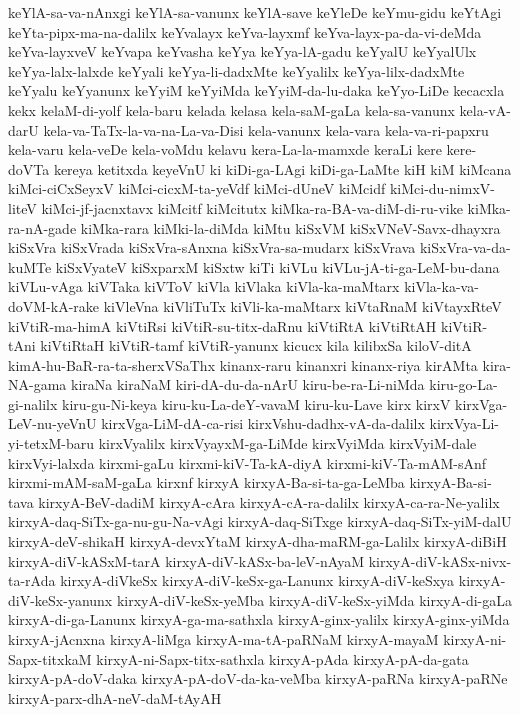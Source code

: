 {keYlA-sa-va-nAnxgi
keYlA-sa-vanunx
keYlA-save
keYleDe
keYmu-gidu
keYtAgi
keYta-pipx-ma-na-dalilx
keYvalayx
keYva-layxmf
keYva-layx-pa-da-vi-deMda
keYva-layxveV
keYvapa
keYvasha
keYya
keYya-lA-gadu
keYyalU
keYyalUlx
keYya-lalx-lalxde
keYyali
keYya-li-dadxMte
keYyalilx
keYya-lilx-dadxMte
keYyalu
keYyanunx
keYyiM
keYyiMda
keYyiM-da-lu-daka
keYyo-LiDe
kecacxla
kekx
kelaM-di-yolf
kela-baru
kelada
kelasa
kela-saM-gaLa
kela-sa-vanunx
kela-vA-darU
kela-va-TaTx-la-va-na-La-va-Disi
kela-vanunx
kela-vara
kela-va-ri-papxru
kela-varu
kela-veDe
kela-voMdu
kelavu
kera-La-la-mamxde
keraLi
kere
kere-doVTa
kereya
ketitxda
keyeVnU
ki
kiDi-ga-LAgi
kiDi-ga-LaMte
kiH
kiM
kiMcana
kiMci-ciCxSeyxV
kiMci-cicxM-ta-yeVdf
kiMci-dUneV
kiMcidf
kiMci-du-nimxV-liteV
kiMci-jf-jacnxtavx
kiMcitf
kiMcitutx
kiMka-ra-BA-va-diM-di-ru-vike
kiMka-ra-nA-gade
kiMka-rara
kiMki-la-diMda
kiMtu
kiSxVM
kiSxVNeV-Savx-dhayxra
kiSxVra
kiSxVrada
kiSxVra-sAnxna
kiSxVra-sa-mudarx
kiSxVrava
kiSxVra-va-da-kuMTe
kiSxVyateV
kiSxparxM
kiSxtw
kiTi
kiVLu
kiVLu-jA-ti-ga-LeM-bu-dana
kiVLu-vAga
kiVTaka
kiVToV
kiVla
kiVlaka
kiVla-ka-maMtarx
kiVla-ka-va-doVM-kA-rake
kiVleVna
kiVliTuTx
kiVli-ka-maMtarx
kiVtaRnaM
kiVtayxRteV
kiVtiR-ma-himA
kiVtiRsi
kiVtiR-su-titx-daRnu
kiVtiRtA
kiVtiRtAH
kiVtiR-tAni
kiVtiRtaH
kiVtiR-tamf
kiVtiR-yanunx
kicucx
kila
kilibxSa
kiloV-ditA
kimA-hu-BaR-ra-ta-sherxVSaThx
kinanx-raru
kinanxri
kinanx-riya
kirAMta
kira-NA-gama
kiraNa
kiraNaM
kiri-dA-du-da-nArU
kiru-be-ra-Li-niMda
kiru-go-La-gi-nalilx
kiru-gu-Ni-keya
kiru-ku-La-deY-vavaM
kiru-ku-Lave
kirx
kirxV
kirxVga-LeV-nu-yeVnU
kirxVga-LiM-dA-ca-risi
kirxVshu-dadhx-vA-da-dalilx
kirxVya-Li-yi-tetxM-baru
kirxVyalilx
kirxVyayxM-ga-LiMde
kirxVyiMda
kirxVyiM-dale
kirxVyi-lalxda
kirxmi-gaLu
kirxmi-kiV-Ta-kA-diyA
kirxmi-kiV-Ta-mAM-sAnf
kirxmi-mAM-saM-gaLa
kirxnf
kirxyA
kirxyA-Ba-si-ta-ga-LeMba
kirxyA-Ba-si-tava
kirxyA-BeV-dadiM
kirxyA-cAra
kirxyA-cA-ra-dalilx
kirxyA-ca-ra-Ne-yalilx
kirxyA-daq-SiTx-ga-nu-gu-Na-vAgi
kirxyA-daq-SiTxge
kirxyA-daq-SiTx-yiM-dalU
kirxyA-deV-shikaH
kirxyA-devxYtaM
kirxyA-dha-maRM-ga-Lalilx
kirxyA-diBiH
kirxyA-diV-kASxM-tarA
kirxyA-diV-kASx-ba-leV-nAyaM
kirxyA-diV-kASx-nivx-ta-rAda
kirxyA-diVkeSx
kirxyA-diV-keSx-ga-Lanunx
kirxyA-diV-keSxya
kirxyA-diV-keSx-yanunx
kirxyA-diV-keSx-yeMba
kirxyA-diV-keSx-yiMda
kirxyA-di-gaLa
kirxyA-di-ga-Lanunx
kirxyA-ga-ma-sathxla
kirxyA-ginx-yalilx
kirxyA-ginx-yiMda
kirxyA-jAcnxna
kirxyA-liMga
kirxyA-ma-tA-paRNaM
kirxyA-mayaM
kirxyA-ni-Sapx-titxkaM
kirxyA-ni-Sapx-titx-sathxla
kirxyA-pAda
kirxyA-pA-da-gata
kirxyA-pA-doV-daka
kirxyA-pA-doV-da-ka-veMba
kirxyA-paRNa
kirxyA-paRNe
kirxyA-parx-dhA-neV-daM-tAyAH
}
